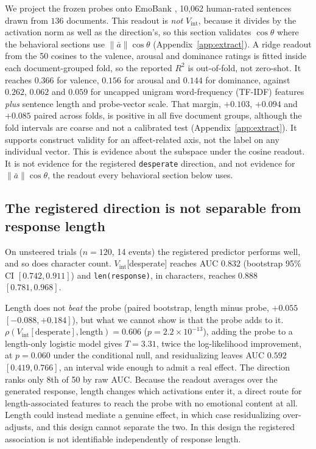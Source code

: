 \documentclass{article}
\begin{document}
We project the frozen probes onto EmoBank \citep{buechel2017emobank}, 10,062
human-rated sentences drawn from $136$ documents. This readout is \emph{not}
$V_{\text{int}}$, because it divides by the activation norm as well as the direction's, so
this section validates $\cos\theta$ where the behavioral sections use
$\lVert \bar a \rVert \cos\theta$ (Appendix~\ref{app:extract}). A ridge readout from
the 50 cosines to the valence, arousal and dominance ratings is fitted inside each
document-grouped fold, so the reported $R^2$ is out-of-fold, not zero-shot. It reaches $\mathbf{0.366}$ for valence, $0.156$ for
arousal and $0.144$ for dominance, against $0.262$, $0.062$ and $0.059$ for
uncapped unigram word-frequency (TF-IDF) features \emph{plus} sentence length and probe-vector scale. That
margin, $+0.103$, $+0.094$ and $+0.085$ paired across folds, is positive in all
five document groups, although the fold intervals are coarse and not a calibrated test
(Appendix~\ref{app:extract}). It supports construct validity
for an affect-related axis, not the label on any individual vector. This is
evidence about the subspace under the cosine readout. It is not evidence for the
registered \texttt{desperate} direction, and not evidence for
$\lVert \bar a \rVert \cos\theta$, the readout every behavioral section below uses.

\subsection{The registered direction is not separable from response length}
\label{sec:len}

On unsteered trials ($n = 120$, 14 events) the registered predictor performs
well, and so does character count. $V_{\text{int}}$[desperate] reaches AUC
$\mathbf{0.832}$ (bootstrap 95\% CI $[0.742, 0.911]$) and \texttt{len(response)}, in
characters, reaches $\mathbf{0.888}$ $[0.781, 0.968]$.

Length does not \emph{beat} the probe (paired bootstrap, length minus probe,
$+0.055$ $[-0.088, +0.184]$), but what we cannot show is that the probe adds to it.
$\rho(V_{\text{int}}[\text{desperate}], \text{length}) = 0.606$
($p = 2.2\times10^{-13}$), adding the probe to a length-only logistic model gives $T = 3.31$, twice the
log-likelihood improvement, at $p = 0.060$ under the conditional null,
and residualizing leaves AUC $\mathbf{0.592}$
$[0.419, 0.766]$, an interval wide enough to admit a real effect. The direction
ranks only 8th of 50 by raw AUC. Because the readout averages over the generated response, length changes which
activations enter it, a direct route for length-associated features to reach the
probe with no emotional content at all. Length could instead
mediate a genuine effect, in which case residualizing over-adjusts, and this design
cannot separate the two. In this design the registered association is not identifiable
independently of response length.
\end{document}
